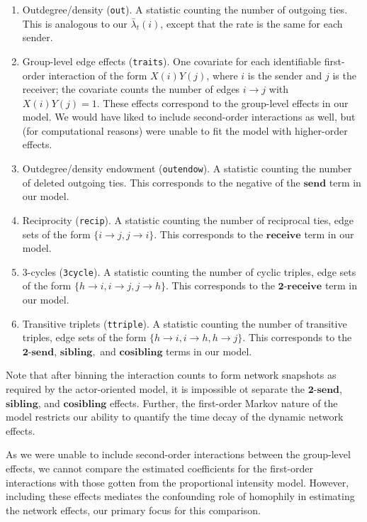 \documentclass[final]{statsoc}
\begin{document}
\begin{enumerate}
  \item Outdegree/density (\texttt{out}). A statistic counting the number
of outgoing ties.  This is analogous to our $\bar \lambda_t(i)$, except that
the rate is the same for each sender.

  \item Group-level edge effects (\texttt{traits}).  One covariate for each
identifiable first-order interaction of the form $X(i) Y(j)$, where $i$ is the
sender and $j$ is the receiver; the covariate counts the number of edges $i
\to j$ with $X(i) Y(j) = 1$.  These effects correspond to the group-level
effects in our model.  We would have liked to include second-order
interactions as well, but (for computational reasons) were unable to fit the model with higher-order
effects.

  \item Outdegree/density endowment (\texttt{outendow}).  A statistic
counting the number of deleted outgoing ties.  This corresponds to the
negative of the $\textbf{send}$ term in our model.

  \item Reciprocity (\texttt{recip}).  A statistic counting the number of
    reciprocal ties, edge sets of the form $\{ i \to j, j \to i \}$.  This
corresponds to the $\textbf{receive}$ term in our model.

  \item 3-cycles (\texttt{3cycle}).  A statistic counting the number of cyclic
triples, edge sets of the form $\{ h \to i, i \to j, j \to h\}$.  This
corresponds to the $\textbf{2-receive}$ term in our model.

  \item Transitive triplets (\texttt{ttriple}).  A statistic counting the
number of transitive triples, edge sets of the form $\{ h \to i, i \to h, h
\to j \}$.  This corresponds to the $\textbf{2-send}$, $\textbf{sibling},$
and $\textbf{cosibling}$ terms in our model.

\end{enumerate}

\noindent
Note that after binning the interaction counts to form network snapshots as
required by the actor-oriented model, it is impossible ot separate the
$\textbf{2-send}$, $\textbf{sibling}$, and $\textbf{cosibling}$ effects.
Further, the first-order Markov nature of the model restricts
our ability to quantify the time decay of the dynamic network effects.

As we were unable to include second-order interactions
between the group-level effects, we cannot compare the estimated coefficients
for the first-order interactions with those gotten from the proportional
intensity model.  However, including these effects mediates the confounding
role of homophily in estimating the network effects, our primary focus for
this comparison.
\end{document}
